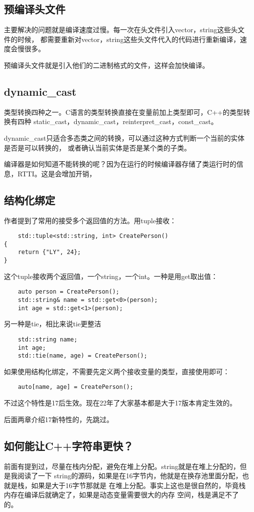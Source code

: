 \documentclass{article}
\begin{document}
\begin{sloppypar}
\subsection{预编译头文件}
主要解决的问题就是编译速度过慢。每一次在头文件引入vector，string这些头文件的时候，
都需要重新对vector，string这些头文件代入的代码进行重新编译，速度会慢很多。

预编译头文件就是引入他们的二进制格式的文件，这样会加快编译。

\subsection{dynamic\_cast}
类型转换四种之一。C语言的类型转换直接在变量前加上类型即可，C++的类型转换有四种
static\_cast，dynamic\_cast，reinterpret\_cast，const\_cast。

dynamic\_cast只适合多态类之间的转换，可以通过这种方式判断一个当前的实体是否是可以转换的，
或者确认当前实体是否是某个类的子类。

编译器是如何知道不能转换的呢？因为在运行的时候编译器存储了类运行时的信息，RTTI。这是会增加开销，

\subsection{结构化绑定}
作者提到了常用的接受多个返回值的方法。用tuple接收：
\begin{lstlisting}
	std::tuple<std::string, int> CreatePerson()
{
    return {"LY", 24};
}

\end{lstlisting}
这个tuple接收两个返回值，一个string，一个int。一种是用get取出值：
\begin{lstlisting}
	auto person = CreatePerson();
    std::string& name = std::get<0>(person);
    int age = std::get<1>(person);
\end{lstlisting}
另一种是tie，相比来说tie更整洁
\begin{lstlisting}
	std::string name;
    int age;
    std::tie(name, age) = CreatePerson();
\end{lstlisting}
如果使用结构化绑定，不需要先定义两个接收变量的类型，直接使用即可：
\begin{lstlisting}
	auto[name, age] = CreatePerson();
\end{lstlisting}
不过这个特性是17后生效。现在22年了大家基本都是大于17版本肯定生效的。

后面两章介绍17新特性的，先跳过。

\subsection{如何能让C++字符串更快？}
前面有提到过，尽量在栈内分配，避免在堆上分配。string就是在堆上分配的，但是我阅读了一下
string的源码，如果是在16字节内，他就是在换存池里面分配，也就是栈，如果是大于16字节那就是
在堆上分配。事实上这也是很自然的，毕竟栈内存在编译后就确定了，如果是动态变量需要很大的内存
空间，栈是满足不了的。


\end{sloppypar}
\end{document}
